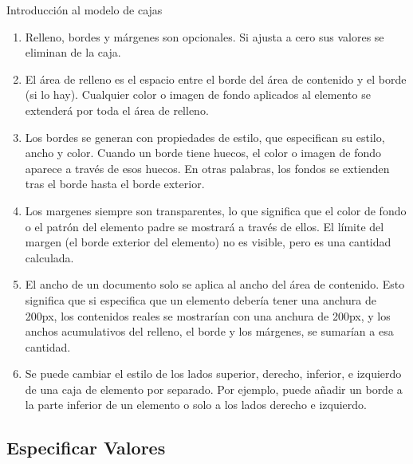 \begin{frame}{Introducción al modelo de cajas}
    \begin{enumerate}
        \item Relleno, bordes y márgenes son opcionales. Si ajusta a cero sus
        valores se eliminan de la caja. 
        \item El área de relleno es el espacio entre el borde del área de
        contenido y el borde (si lo hay). Cualquier color o imagen de fondo
        aplicados al elemento se extenderá por toda el área de relleno. 
        \item Los bordes se generan con propiedades de estilo, que especifican
        su estilo, ancho y color. Cuando un borde tiene huecos, el color o
        imagen de fondo aparece a través de esos huecos. En otras palabras, los
        fondos se extienden tras el borde hasta el borde exterior. 
        \item Los margenes siempre son transparentes, lo que significa que el
        color de fondo o el patrón del elemento padre se mostrará a través de
        ellos. El límite del margen (el borde exterior del elemento) no es
        visible,  pero es una cantidad calculada. 
        \item El ancho de un documento solo se aplica al ancho del área de
        contenido. Esto significa que si especifica que un elemento debería
        tener una anchura de 200px, los contenidos reales se mostrarían con una
        anchura de 200px, y los anchos acumulativos del relleno, el borde y los
        márgenes, se sumarían a esa cantidad.
        \item Se puede cambiar el estilo de los lados superior, derecho,
        inferior, e izquierdo de una caja de elemento por separado. Por
        ejemplo, puede añadir un borde a la parte inferior de un elemento o
        solo a los lados derecho e izquierdo. 
    \end{enumerate}
    
\end{frame}

\subsection{Especificar Valores} %


